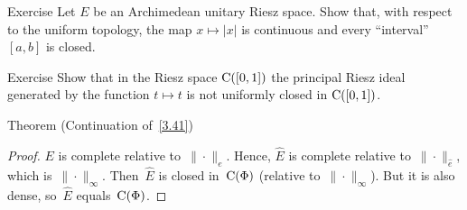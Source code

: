 \documentclass[main.tex]{subfiles}
\begin{document}
%
%
\begin{psec}{4.3}{Exercise}
Let $E$ be an Archimedean unitary Riesz space.
Show that,
with respect to the uniform topology,
the map $x\mapsto|x|$
is continuous
and every ``interval'' $[a,b]$ is closed.
\end{psec}
%
%
\begin{psec}{4.4}{Exercise}
Show that in the Riesz space $\mathrm{C}([0,1])$
the principal Riesz ideal
generated by the function $t\mapsto t$
is not uniformly closed in $\mathrm{C}([0,1])$.
\end{psec}
%
%
\begin{psec}{4.5}{Theorem}
(Continuation of~\ref{3.41})
\end{psec}
\begin{proof}
$E$ is complete relative to~$\|\cdot\|_e$.
Hence, $\hat{E}$ is complete relative to~$\|\cdot\|_{\hat{e}}$,
which is~$\|\cdot\|_\infty$.
Then~$\hat{E}$ is closed in~$\mathrm{C}(\Phi)$
(relative to~$\|\cdot\|_\infty$).
But it is also dense,
so~$\hat{E}$ equals~$\mathrm{C}(\Phi)$. \xqed
\end{proof}
%
%
\end{document}
